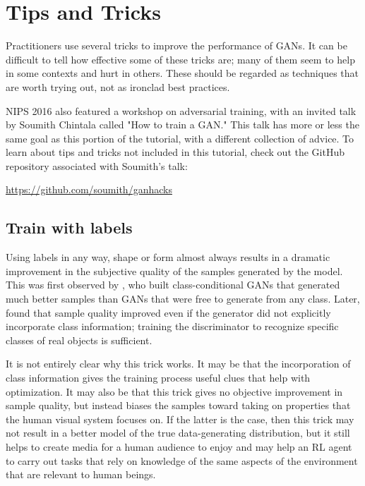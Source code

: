 \section{Tips and Tricks}

Practitioners use several tricks to improve the performance of GANs.
It can be difficult to tell how effective some of these tricks are;
many of them seem to help in some contexts and hurt in others.
These should be regarded as techniques that are worth trying out,
not as ironclad best practices.

NIPS 2016 also featured a workshop on adversarial training, with
an invited talk by Soumith Chintala called "How to train a GAN."
This talk has more or less the same goal as this portion of the tutorial,
with a different collection of advice.
To learn about tips and tricks not included in this tutorial, check
out the GitHub repository associated with Soumith's talk:

\url{https://github.com/soumith/ganhacks}


\subsection{Train with labels}

Using labels in any way, shape or form almost always results in a dramatic
improvement in the subjective quality of the samples generated by the model.
This was first observed by \citet{denton2015deep}, who built class-conditional
GANs that generated much better samples than GANs that were free to generate
from any class.
Later, \citet{salimans2016improved} found that sample quality improved
even if the generator did not explicitly incorporate class information; training
 the discriminator to recognize specific classes of real objects is sufficient.

 It is not entirely clear why this trick works.
 It may be that the incorporation of class information gives the training
 process useful clues that help with optimization.
 It may also be that this trick gives no objective improvement in sample quality,
 but instead biases the samples toward taking on properties that the human
 visual system focuses on.
 If the latter is the case, then this trick may not result in a better model
 of the true data-generating distribution, but it still helps to create media
 for a human audience to enjoy and may help an RL agent to carry out tasks
 that rely on knowledge of the same aspects of the environment that are relevant
 to human beings.

